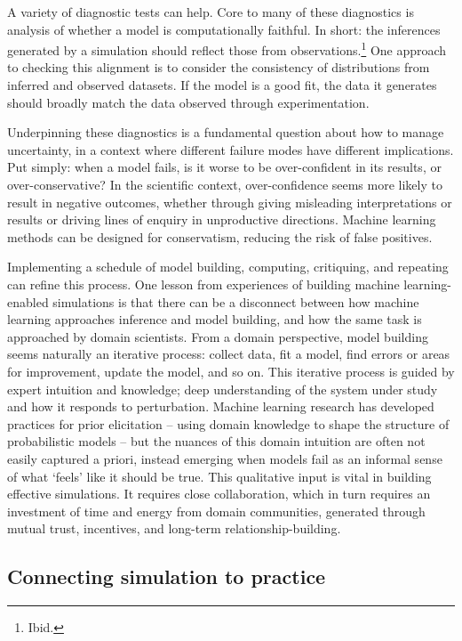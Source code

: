 A variety of diagnostic tests can help. Core to many of these
diagnostics is analysis of whether a model is computationally faithful.
In short: the inferences generated by a simulation should reflect those
from observations.\footnote{Ibid.} One approach to checking this
alignment is to consider the consistency of distributions from inferred
and observed datasets. If the model is a good fit, the data it generates
should broadly match the data observed through experimentation.

Underpinning these diagnostics is a fundamental question about how to
manage uncertainty, in a context where different failure modes have
different implications. Put simply: when a model fails, is it worse to
be over-confident in its results, or over-conservative? In the
scientific context, over-confidence seems more likely to result in
negative outcomes, whether through giving misleading interpretations or
results or driving lines of enquiry in unproductive directions. Machine
learning methods can be designed for conservatism, reducing the risk of
false positives.

Implementing a schedule of model building, computing, critiquing, and
repeating can refine this process. One lesson from experiences of
building machine learning-enabled simulations is that there can be a
disconnect between how machine learning approaches inference and model
building, and how the same task is approached by domain scientists. From
a domain perspective, model building seems naturally an iterative
process: collect data, fit a model, find errors or areas for
improvement, update the model, and so on. This iterative process is
guided by expert intuition and knowledge; deep understanding of the
system under study and how it responds to perturbation. Machine learning
research has developed practices for prior elicitation -- using domain
knowledge to shape the structure of probabilistic models -- but the
nuances of this domain intuition are often not easily captured a priori,
instead emerging when models fail as an informal sense of what `feels'
like it should be true. This qualitative input is vital in building
effective simulations. It requires close collaboration, which in turn
requires an investment of time and energy from domain communities,
generated through mutual trust, incentives, and long-term
relationship-building.

\subsection{Connecting simulation to
practice}\label{connecting-simulation-to-practice}

